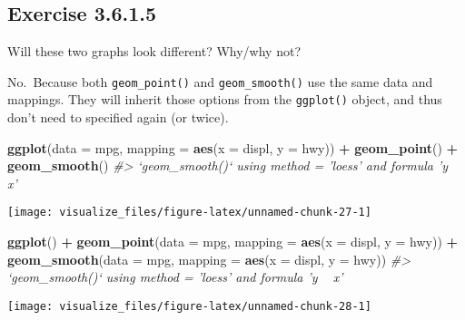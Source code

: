 \documentclass[]{book}
\newenvironment{Shaded}{\begin{snugshade}}{\end{snugshade}}
\newcommand{\CommentTok}[1]{\textcolor[rgb]{0.56,0.35,0.01}{\textit{#1}}}
\newcommand{\DataTypeTok}[1]{\textcolor[rgb]{0.13,0.29,0.53}{#1}}
\newcommand{\KeywordTok}[1]{\textcolor[rgb]{0.13,0.29,0.53}{\textbf{#1}}}
\newcommand{\NormalTok}[1]{#1}
\newcommand{\OperatorTok}[1]{\textcolor[rgb]{0.81,0.36,0.00}{\textbf{#1}}}
\newcommand{\StringTok}[1]{\textcolor[rgb]{0.31,0.60,0.02}{#1}}
\theoremstyle{plain}
\theoremstyle{remark}
\begin{document}
\hypertarget{exercise-3.6.1.5}{%
\subsection*{\texorpdfstring{Exercise
{3.6.1.5}}{Exercise 3.6.1.5}}\label{exercise-3.6.1.5}}

Will these two graphs look different? Why/why not?

No.~Because both \texttt{geom\_point()} and \texttt{geom\_smooth()} use
the same data and mappings. They will inherit those options from the
\texttt{ggplot()} object, and thus don't need to specified again (or
twice).

\begin{Shaded}
\begin{Highlighting}[]
\KeywordTok{ggplot}\NormalTok{(}\DataTypeTok{data =}\NormalTok{ mpg, }\DataTypeTok{mapping =} \KeywordTok{aes}\NormalTok{(}\DataTypeTok{x =}\NormalTok{ displ, }\DataTypeTok{y =}\NormalTok{ hwy)) }\OperatorTok{+}
\StringTok{  }\KeywordTok{geom_point}\NormalTok{() }\OperatorTok{+}
\StringTok{  }\KeywordTok{geom_smooth}\NormalTok{()}
\CommentTok{#> `geom_smooth()` using method = 'loess' and formula 'y ~ x'}
\end{Highlighting}
\end{Shaded}

\begin{center}\texttt{[image: visualize\_files/figure-latex/unnamed-chunk-27-1]} \end{center}

\begin{Shaded}
\begin{Highlighting}[]
\KeywordTok{ggplot}\NormalTok{() }\OperatorTok{+}
\StringTok{  }\KeywordTok{geom_point}\NormalTok{(}\DataTypeTok{data =}\NormalTok{ mpg, }\DataTypeTok{mapping =} \KeywordTok{aes}\NormalTok{(}\DataTypeTok{x =}\NormalTok{ displ, }\DataTypeTok{y =}\NormalTok{ hwy)) }\OperatorTok{+}
\StringTok{  }\KeywordTok{geom_smooth}\NormalTok{(}\DataTypeTok{data =}\NormalTok{ mpg, }\DataTypeTok{mapping =} \KeywordTok{aes}\NormalTok{(}\DataTypeTok{x =}\NormalTok{ displ, }\DataTypeTok{y =}\NormalTok{ hwy))}
\CommentTok{#> `geom_smooth()` using method = 'loess' and formula 'y ~ x'}
\end{Highlighting}
\end{Shaded}

\begin{center}\texttt{[image: visualize\_files/figure-latex/unnamed-chunk-28-1]} \end{center}
\end{document}
